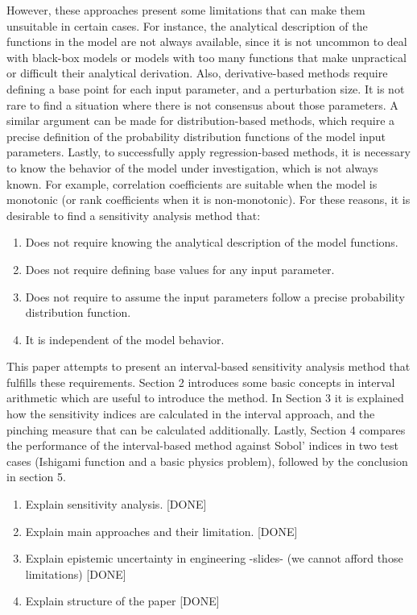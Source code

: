 \documentclass[twocolumn]{rps-esrl2020}
\begin{document}
However, these approaches present some limitations that can make them unsuitable in certain cases.
For instance, the analytical description of the functions in the model are not always available, since it is not uncommon to deal with black-box models or
models with too many functions that make unpractical or difficult their analytical derivation.
Also, derivative-based methods require defining a base point for each input parameter, and a perturbation size.
It is not rare to find a situation where there is not consensus about those parameters.
A similar argument can be made for distribution-based methods, which require a precise definition of the probability distribution functions of the model input
parameters.
Lastly, to successfully apply regression-based methods, it is necessary to know the behavior of the model under investigation, which is not always known.
For example, correlation coefficients are suitable when the model is monotonic (or rank coefficients when it is non-monotonic).
For these reasons, it is desirable to find a sensitivity analysis method that:

\begin{enumerate}
	\item Does not require knowing the analytical description of the model functions.
	\item Does not require defining base values for any input parameter.
	\item Does not require to assume the input parameters follow a precise probability distribution function.
	\item It is independent of the model behavior.
\end{enumerate}

This paper attempts to present an interval-based sensitivity analysis method that fulfills these requirements.
Section 2 introduces some basic concepts in interval arithmetic which are useful to introduce the method.
In Section 3 it is explained how the sensitivity indices are calculated in the interval approach, and the
pinching measure that can be calculated additionally.
Lastly, Section 4 compares the performance of the interval-based method against Sobol' indices in two test cases
(Ishigami function and a basic physics problem), followed by the conclusion in section 5.

\begin{enumerate}
	\item Explain sensitivity analysis. [DONE]
	\item Explain main approaches and their limitation. [DONE]
	\item Explain epistemic uncertainty in engineering -slides- (we cannot afford those limitations) [DONE]
	\item Explain structure of the paper [DONE]
\end{enumerate}
\end{document}
